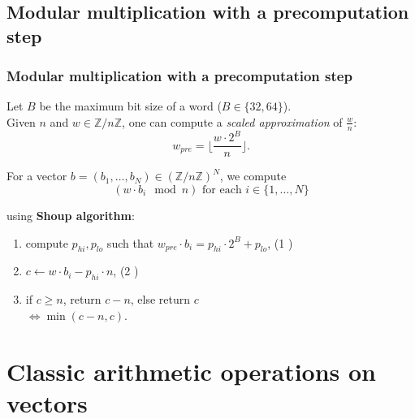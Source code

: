 \documentclass[10pt]{beamer}
\begin{document}
\subsection{Modular multiplication with a precomputation step}
\begin{frame}
    \frametitle{Modular multiplication with a precomputation step}

    \begin{mybox}
        Let $B$ be the maximum bit size of a word ($B\in \{32, 64\}$). \\
        Given $n$ and $w \in \mathbb{Z}/n\mathbb{Z}$, one can compute a \textit{scaled approximation} 
        of $\frac{w}{n}$: $$ w_{pre} = \biggl\lfloor\dfrac{w\cdot 2^{B}}{n} \biggr\rfloor.$$
    \end{mybox}

    \pause
    \bigskip
    For a vector $b = (b_1,\dots, b_N) \in (\mathbb{Z}/n\mathbb{Z})^N$, we compute 
    $$(w\cdot b_i \mod n) \text{ for each } i\in \{1, \dots, N\}$$

    using \textbf{Shoup algorithm}\cite{Bos_Stam_2021}:
    \medskip
    \begin{enumerate}
        \item compute $p_{hi}, p_{lo}$ such that $w_{pre} \cdot b_i = p_{hi}\cdot 2^B + p_{lo}$, \hfill (1 )
        \item $c \gets w\cdot b_i - p_{hi}\cdot n$, \hfill (2 )
        \item if $c \geq n$, return $c-n$, else return $c$ \\
            $\Longleftrightarrow \min(c-n, c)$.
    \end{enumerate}
\end{frame}

\section{Classic arithmetic operations on vectors}
\end{document}
